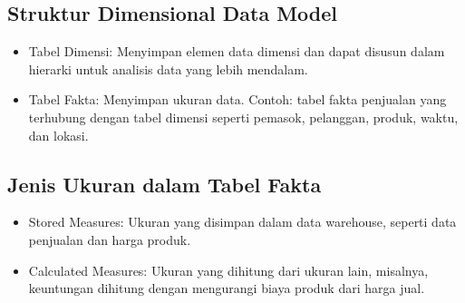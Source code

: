 \documentclass{article}
\begin{document}
\subsection{Struktur Dimensional Data Model}
\begin{itemize}
    \item Tabel Dimensi: Menyimpan elemen data dimensi dan dapat disusun dalam hierarki untuk analisis data yang lebih mendalam.
    \item Tabel Fakta: Menyimpan ukuran data. Contoh: tabel fakta penjualan yang terhubung dengan tabel dimensi seperti pemasok, pelanggan, produk, waktu, dan lokasi.
\end{itemize}

\subsection{Jenis Ukuran dalam Tabel Fakta}
\begin{itemize}
    \item Stored Measures: Ukuran yang disimpan dalam data warehouse, seperti data penjualan dan harga produk.
    \item Calculated Measures: Ukuran yang dihitung dari ukuran lain, misalnya, keuntungan dihitung dengan mengurangi biaya produk dari harga jual.
\end{itemize}
\end{document}
